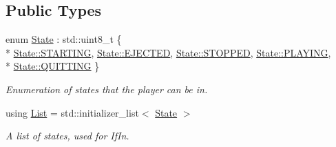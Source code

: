\subsection*{Public Types}
\begin{DoxyCompactItemize}
\item 
enum \hyperlink{classPlayerState_ab013f68ff23d69d677faae624b5dff07}{State} \+: std\+::uint8\+\_\+t \{ \\*
\hyperlink{classPlayerState_ab013f68ff23d69d677faae624b5dff07a034312d8adc8099c1c6f53aaff745e26}{State\+::\+S\+T\+A\+R\+T\+I\+N\+G}, 
\hyperlink{classPlayerState_ab013f68ff23d69d677faae624b5dff07a209d5541434371bb6b79dc8cca8fa55b}{State\+::\+E\+J\+E\+C\+T\+E\+D}, 
\hyperlink{classPlayerState_ab013f68ff23d69d677faae624b5dff07a09d4d696b4e935115b9313e3c412509a}{State\+::\+S\+T\+O\+P\+P\+E\+D}, 
\hyperlink{classPlayerState_ab013f68ff23d69d677faae624b5dff07a50366a49630a416ab3ccaa004196027e}{State\+::\+P\+L\+A\+Y\+I\+N\+G}, 
\\*
\hyperlink{classPlayerState_ab013f68ff23d69d677faae624b5dff07a4eb3979af877a3c13830cd69c746e230}{State\+::\+Q\+U\+I\+T\+T\+I\+N\+G}
 \}
\begin{DoxyCompactList}\small\item\em Enumeration of states that the player can be in. \end{DoxyCompactList}\item 
\hypertarget{classPlayerState_a0f4e455f0579f97740855ccc6177c9f1}{using \hyperlink{classPlayerState_a0f4e455f0579f97740855ccc6177c9f1}{List} = std\+::initializer\+\_\+list$<$ \hyperlink{classPlayerState_ab013f68ff23d69d677faae624b5dff07}{State} $>$}\label{classPlayerState_a0f4e455f0579f97740855ccc6177c9f1}

\begin{DoxyCompactList}\small\item\em A list of states, used for If\+In. \end{DoxyCompactList}\end{DoxyCompactItemize}
